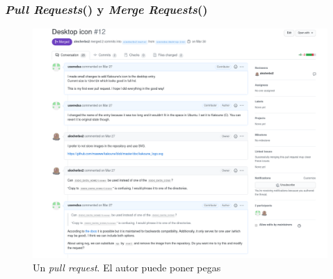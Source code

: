 \begin{frame}\frametitle{
\textit{Pull Requests}(\GitHub) y \textit{Merge Requests}(\GitLab)
}
\begin{figure}[h]
    \centering
    \includegraphics[height=0.7\pageheight]{images/pull-request-example.png}
    \caption{Un \textit{pull request}. El autor puede poner pegas}
\end{figure}

\href{https://github.com/alberto-ros/apuntes-aec/commit/8b114293d0a19697f0a8db69a6c8005bb6af8911}{}
\href{https://github.com/useredsa/bspwm.kak/pull/1}{
}
\end{frame}


